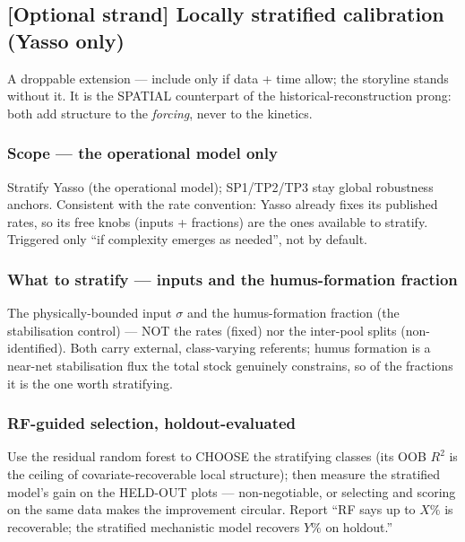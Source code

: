 \documentclass[11pt]{article}
\newif\ifstrat
\begin{document}
\ifstrat
{\color{red}
\subsection{[Optional strand] Locally stratified calibration (Yasso only)}
A droppable extension --- include only if data + time allow; the storyline stands
without it. It is the SPATIAL counterpart of the historical-reconstruction prong:
both add structure to the \emph{forcing}, never to the kinetics.

\subsubsection{Scope --- the operational model only}
Stratify Yasso (the operational model); SP1/TP2/TP3 stay global robustness anchors.
Consistent with the rate convention: Yasso already fixes its published rates, so its
free knobs (inputs + fractions) are the ones available to stratify. Triggered only
``if complexity emerges as needed'', not by default.

\subsubsection{What to stratify --- inputs and the humus-formation fraction}
The physically-bounded input $\sigma$ and the humus-formation fraction (the
stabilisation control) --- NOT the rates (fixed) nor the inter-pool splits
(non-identified). Both carry external, class-varying referents; humus formation is
a near-net stabilisation flux the total stock genuinely constrains, so of the
fractions it is the one worth stratifying.

\subsubsection{RF-guided selection, holdout-evaluated}
Use the residual random forest to CHOOSE the stratifying classes (its OOB $R^2$ is
the ceiling of covariate-recoverable local structure); then measure the stratified
model's gain on the HELD-OUT plots --- non-negotiable, or selecting and scoring on
the same data makes the improvement circular. Report ``RF says up to $X\%$ is
recoverable; the stratified mechanistic model recovers $Y\%$ on holdout.''

}
\end{document}
